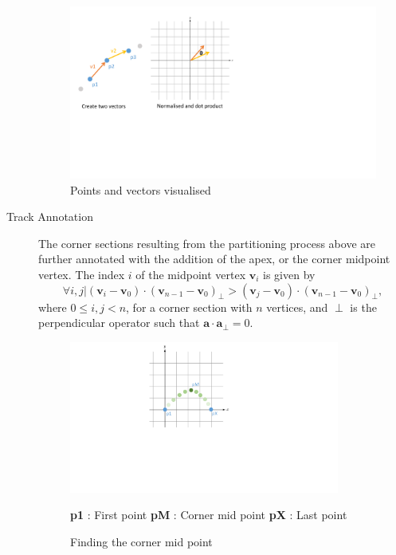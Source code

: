\begin{description}
	\begin{figure}[!htb]
		\centering
		\includegraphics[width=\textwidth]{diagrams/vectorCorners.pdf}
		\caption[Splicing using vectors]{Points and vectors visualised}
		\label{fig:diagram-vectorCorners}
	\end{figure}
	
	\item [Track Annotation] The corner sections resulting from the partitioning process above are further annotated with the addition of the apex, or the corner midpoint vertex. The index $i$ of the midpoint vertex $\mathbf{v}_i$ is given by
	\begin{equation}
		\forall i,j | (\mathbf{v}_i - \mathbf{v}_0) \cdot (\mathbf{v}_{n-1} - \mathbf{v}_0)_{\perp} > (\mathbf{v}_j - \mathbf{v}_0) \cdot (\mathbf{v}_{n-1} - \mathbf{v}_0)_{\perp},  
	\end{equation} 
	where $0 \leq i,j < n$, for a corner section with $n$ vertices, and $\perp$ is the perpendicular operator such that $\mathbf{a} \cdot \mathbf{a}_{\perp} = 0$. 

	
	\begin{figure}[!htb]
		\centering
		\includegraphics[height=5cm]{diagrams/cornerMidPoint.pdf}
		\caption[Corner mid point]{Finding the corner mid point}
		\textbf{p1} : First point \textbf{pM} : Corner mid point \textbf{pX} : Last point
		\label{fig:diagram-cornerMidPoint}
	\end{figure}
	

\end{description}
